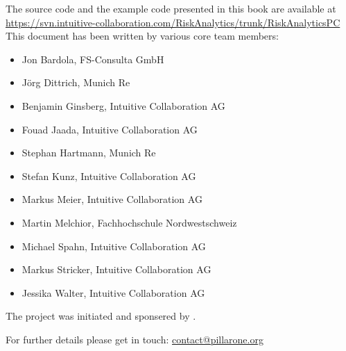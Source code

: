 \begin{titlepage}
\begin{flushleft}
{{The \RA{} source code and the example code presented in this book are available %
at\\
\url{https://svn.intuitive-collaboration.com/RiskAnalytics/trunk/RiskAnalyticsPC}\\[1cm]

This document has been written by various \PO{} core team members:
\begin{itemize}\tightitemize{0pt}
  \item Jon Bardola, FS-Consulta GmbH
	\item J\"org Dittrich, Munich Re
	\item Benjamin Ginsberg, Intuitive Collaboration AG
	\item Fouad Jaada, Intuitive Collaboration AG
	\item Stephan Hartmann, Munich Re
	\item Stefan Kunz, Intuitive Collaboration AG
	\item Markus Meier, Intuitive Collaboration AG
	\item	Martin Melchior, Fachhochschule Nordwestschweiz
	\item Michael Spahn, Intuitive Collaboration AG
	\item Markus Stricker, Intuitive Collaboration AG
	\item Jessika Walter, Intuitive Collaboration AG
\end{itemize}
\vspace*{1cm}

The \PO{} project was initiated and sponsered by \MR.
}}

\vspace*{1cm}

For further details please get in touch: \href{mailto:contact@pillarone.org}{contact@pillarone.org}

\end{flushleft}
\end{titlepage}




